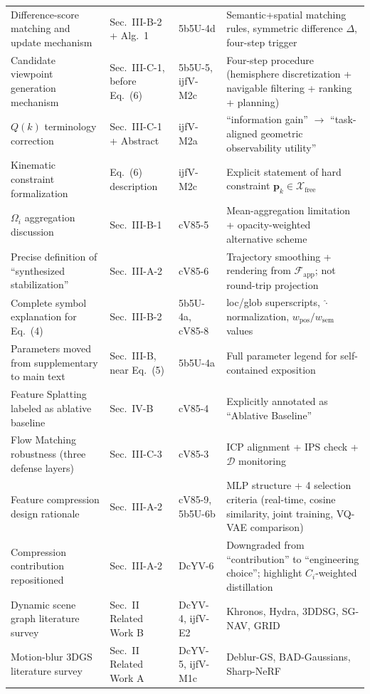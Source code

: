 \documentclass[10pt,a4paper]{article}
\begin{document}
\begin{longtable}{L{3.6cm}L{2.6cm}L{1.8cm}L{5.8cm}}
Difference-score matching and update mechanism & Sec.~III-B-2 + Alg.~1 & 5b5U-4d & Semantic+spatial matching rules, symmetric difference $\Delta$, four-step trigger\\
Candidate viewpoint generation mechanism & Sec.~III-C-1, before Eq.~(6) & 5b5U-5, ijfV-M2c & Four-step procedure (hemisphere discretization + navigable filtering + ranking + planning)\\
$Q(k)$ terminology correction & Sec.~III-C-1 + Abstract & ijfV-M2a & ``information gain'' $\to$ ``task-aligned geometric observability utility''\\
Kinematic constraint formalization & Eq.~(6) description & ijfV-M2c & Explicit statement of hard constraint $\mathbf{p}_k\in\mathcal{X}_{\text{free}}$\\
$\Omega_i$ aggregation discussion & Sec.~III-B-1 & cV85-5 & Mean-aggregation limitation + opacity-weighted alternative scheme\\
Precise definition of ``synthesized stabilization'' & Sec.~III-A-2 & cV85-6 & Trajectory smoothing + rendering from $\mathcal{F}_{\text{app}}$; not round-trip projection\\
Complete symbol explanation for Eq.~(4) & Sec.~III-B-2 & 5b5U-4a, cV85-8 & loc/glob superscripts, $\hat{\cdot}$ normalization, $w_{\text{pos}}/w_{\text{sem}}$ values\\
Parameters moved from supplementary to main text & Sec.~III-B, near Eq.~(5) & 5b5U-4a & Full parameter legend for self-contained exposition\\
Feature Splatting labeled as ablative baseline & Sec.~IV-B & cV85-4 & Explicitly annotated as ``Ablative Baseline''\\
Flow Matching robustness (three defense layers) & Sec.~III-C-3 & cV85-3 & ICP alignment + IPS check + $\mathcal{D}$ monitoring\\
Feature compression design rationale & Sec.~III-A-2 & cV85-9, 5b5U-6b & MLP structure + 4 selection criteria (real-time, cosine similarity, joint training, VQ-VAE comparison)\\
Compression contribution repositioned & Sec.~III-A-2 & DcYV-6 & Downgraded from ``contribution'' to ``engineering choice''; highlight $C_i$-weighted distillation\\
Dynamic scene graph literature survey & Sec.~II Related Work B & DcYV-4, ijfV-E2 & Khronos, Hydra, 3DDSG, SG-NAV, GRID\\
Motion-blur 3DGS literature survey & Sec.~II Related Work A & DcYV-5, ijfV-M1c & Deblur-GS, BAD-Gaussians, Sharp-NeRF\\

\end{longtable}
\end{document}
